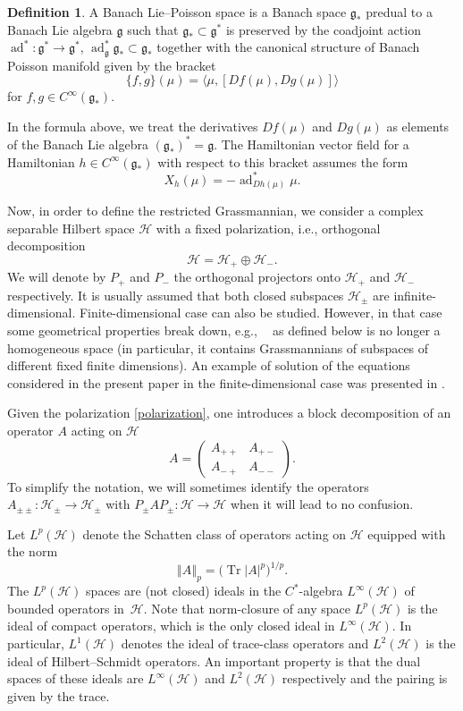 \documentclass[10pt,a4paper]{amsart}
\theoremstyle{definition}
\newtheorem{defn}[thm]{Definition}
\numberwithin{equation}{section}
\newcommand{\norm}[1]{\left\Vert#1\right\Vert}
\renewcommand{\H}{\mathcal{H}}
\newcommand{\g}{\mathfrak{g}}
\DeclareMathOperator{\Gr}{Gr_{res}(\H,\H_+)}
\DeclareMathOperator{\Tr}{Tr}
\DeclareMathOperator{\ad}{ad}
\newcommand{\Li}{L^\infty(\H)}
\newcommand{\Lj}{L^1(\H)}
\newcommand{\Ld}{L^2(\H)}
\newcommand{\Lp}{L^p(\H)}
\newcommand{\abs}[1]{\left\vert#1\right\vert}
\renewcommand{\to}{\rightarrow}
\newcommand{\be}{\begin{equation}}
\newcommand{\ee}{\end{equation}}
\begin{document}
\begin{defn}\label{def:blp}
A Banach Lie--Poisson space is a Banach space $\g_*$ predual to a Banach Lie algebra $\g$ such that $\g_*\subset \g^*$ is preserved by the coadjoint action $\ad^*\colon\g^*\to\g^*$,
$\ad^*_\g \g_*\subset \g_*$
together with the canonical structure of Banach Poisson manifold given by the bracket
\[ %
\{f,g\}(\mu) = \langle \mu, [Df(\mu),Dg(\mu)] \rangle \]
for $f,g\in C^\infty(\g_*)$.
\end{defn}

In the formula above, we treat the derivatives $Df(\mu)$ and $Dg(\mu)$ as elements of the Banach Lie algebra $(\g_*)^*=\g$. The Hamiltonian vector field for a Hamiltonian $h\in C^\infty(\g_*)$ with respect to this bracket assumes the form
\be \label{blp-hvf}
X_h(\mu) = -\ad^*_{Dh(\mu)}\mu.\ee


Now, in order to define the restricted Grassmannian, we consider a complex separable Hilbert space $\H$ with a fixed polarization, i.e., orthogonal decomposition
\be\label{polarization}\H=\H_+\oplus \H_-.\ee
We will denote by $P_+$ and $P_-$ the orthogonal projectors onto $\H_+$ and $\H_-$ respectively. It is usually assumed that both closed subspaces $\H_\pm$ are infinite-dimensional.
Finite-dimensional case can also be studied. However, in that case some geometrical properties break down, e.g., $\Gr$ as defined below is no longer a homogeneous space (in particular, it contains Grassmannians of subspaces of different fixed finite dimensions). An example of solution of the equations considered in the present paper in the finite-dimensional case was presented in \cite{GT-partiso-bial}.

Given the polarization \eqref{polarization}, one introduces a block decomposition of an operator $A$ acting on $\H$
\be \label{blocks}
A=\left(
\begin{matrix}
 A_{++} & A_{+-}\\
 A_{-+} & A_{--}
\end{matrix}
\right).\ee
To simplify the notation, we will sometimes identify the operators $A_{\pm\pm}\colon\H_\pm\to\H_\pm$ with $P_\pm A P_\pm\colon\H\to\H$ when it will lead to no confusion.

Let $\Lp$ denote the Schatten class of operators acting on $\H$ equipped with the norm
\[
 \norm{A}_p = \bigl(\Tr \abs A^p\bigr)^{1/p}.
 \]
The $\Lp$ spaces are (not closed) ideals in the $C^*$-algebra $\Li$ of bounded operators in~$\H$. Note that norm-closure of any space $\Lp$ is the ideal of compact operators, which is the only closed ideal in $\Li$. In particular, $\Lj$ denotes the ideal of trace-class operators and $\Ld$ is the ideal of Hilbert--Schmidt operators. An important property is that the dual spaces of these ideals are $\Li$ and $\Ld$ respectively and the pairing is given by the trace.
\end{document}
